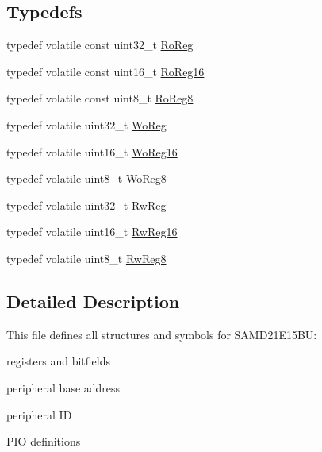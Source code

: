 \subsection*{Typedefs}
\begin{DoxyCompactItemize}
\item 
typedef volatile const uint32\+\_\+t \mbox{\hyperlink{group___s_a_m_d21_e15_b_u__definitions_ga5d556f8391af4141be23f7334ac9dd68}{Ro\+Reg}}
\item 
typedef volatile const uint16\+\_\+t \mbox{\hyperlink{group___s_a_m_d21_e15_b_u__definitions_gaebf6e33c2d49a802e06e22a95ea9d0d0}{Ro\+Reg16}}
\item 
typedef volatile const uint8\+\_\+t \mbox{\hyperlink{group___s_a_m_d21_e15_b_u__definitions_ga0d957f1433aaf5d70e4dc2b68288442d}{Ro\+Reg8}}
\item 
typedef volatile uint32\+\_\+t \mbox{\hyperlink{group___s_a_m_d21_e15_b_u__definitions_gac0f96d4e8018367b38f527007cf0eafd}{Wo\+Reg}}
\item 
typedef volatile uint16\+\_\+t \mbox{\hyperlink{group___s_a_m_d21_e15_b_u__definitions_ga0ab0e5f6c8301aa1c2068e511d854094}{Wo\+Reg16}}
\item 
typedef volatile uint8\+\_\+t \mbox{\hyperlink{group___s_a_m_d21_e15_b_u__definitions_ga5e336e5a36ee12ebeafb021108e5275b}{Wo\+Reg8}}
\item 
typedef volatile uint32\+\_\+t \mbox{\hyperlink{group___s_a_m_d21_e15_b_u__definitions_gacf1496e3bbe303e55f627fc7558a68c7}{Rw\+Reg}}
\item 
typedef volatile uint16\+\_\+t \mbox{\hyperlink{group___s_a_m_d21_e15_b_u__definitions_gacce07556c80fc352ae607f225f19fed5}{Rw\+Reg16}}
\item 
typedef volatile uint8\+\_\+t \mbox{\hyperlink{group___s_a_m_d21_e15_b_u__definitions_gae361754be775bb192f85821d3ab33c17}{Rw\+Reg8}}
\end{DoxyCompactItemize}


\subsection{Detailed Description}
This file defines all structures and symbols for S\+A\+M\+D21\+E15\+BU\+:
\begin{DoxyItemize}
\item registers and bitfields
\item peripheral base address
\item peripheral ID
\item P\+IO definitions 
\end{DoxyItemize}


